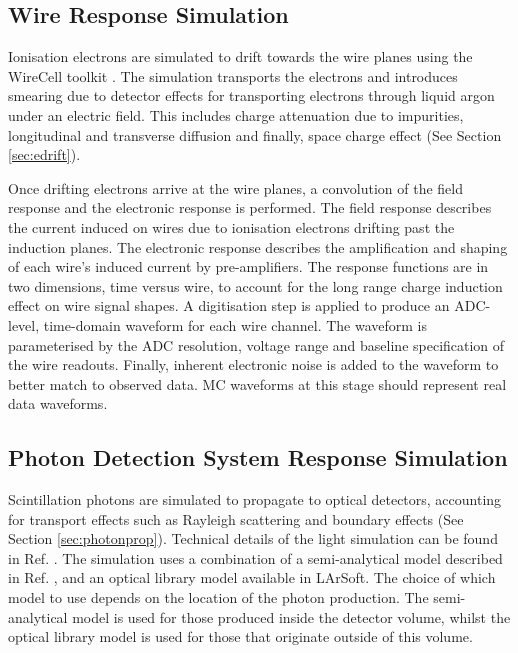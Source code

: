 \subsection{Wire Response Simulation}
\label{sec:wire_response}

Ionisation electrons are simulated to drift towards the wire planes using the WireCell toolkit \cite{wirecell}.
The simulation transports the electrons and introduces smearing due to detector effects for transporting electrons through liquid argon under an electric field.
This includes charge attenuation due to impurities, longitudinal and transverse diffusion and finally, space charge effect (See Section \ref{sec:edrift}).

Once drifting electrons arrive at the wire planes, a convolution of the field response and the electronic response is performed.
The field response describes the current induced on wires due to ionisation electrons drifting past the induction planes.
The electronic response describes the amplification and shaping of each wire's induced current by pre-amplifiers.
The response functions are in two dimensions, time versus wire, to account for the long range charge induction effect on wire signal shapes.
A digitisation step is applied to produce an ADC-level, time-domain waveform for each wire channel.
The waveform is parameterised by the ADC resolution, voltage range and baseline specification of the wire readouts.
Finally, inherent electronic noise is added to the waveform to better match to observed data.
MC waveforms at this stage should represent real data waveforms.

\subsection{Photon Detection System Response Simulation}
\label{sec:pds_response}

Scintillation photons are simulated to propagate to optical detectors, accounting for transport effects such as Rayleigh scattering and boundary effects (See Section \ref{sec:photonprop}).
Technical details of the light simulation can be found in Ref. \cite{sbnd_pds_paper}.
The simulation uses a combination of a semi-analytical model described in Ref. \cite{pds_sim}, and an optical library model available in LArSoft.
The choice of which model to use depends on the location of the photon production.
The semi-analytical model is used for those produced inside the detector volume, whilst the optical library model is used for those that originate outside of this volume.


